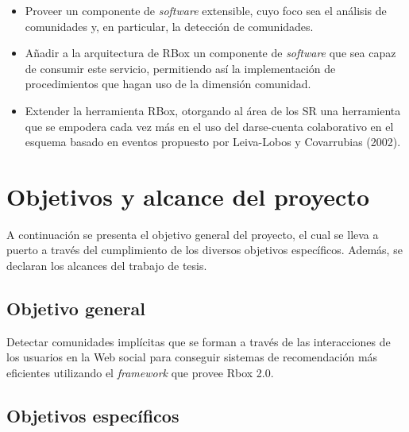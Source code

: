 \begin{itemize}
  \item Proveer un componente de \textit{software} extensible, cuyo foco sea el análisis de comunidades y, en particular, la detección de comunidades.
  \item Añadir a la arquitectura de RBox un componente de \textit{software} que sea capaz de consumir este servicio, permitiendo así la implementación de procedimientos que hagan uso de la dimensión comunidad.
  \item Extender la herramienta RBox, otorgando al área de los SR una herramienta que se empodera cada vez más en el uso del darse-cuenta colaborativo en el esquema basado en eventos propuesto por Leiva-Lobos y Covarrubias (2002).
\end{itemize}

\section{Objetivos y alcance del proyecto}
\label{intro:objetivos}

A continuación se presenta el objetivo general del proyecto, el cual se lleva a puerto a través del cumplimiento de los diversos objetivos específicos. Además, se declaran los alcances del trabajo de tesis.

\subsection{Objetivo general}

Detectar comunidades implícitas que se forman a través de las interacciones de los usuarios en la Web social para conseguir sistemas de recomendación más eficientes utilizando el \textit{framework} que provee Rbox 2.0.

\subsection{Objetivos espec\'ificos}


